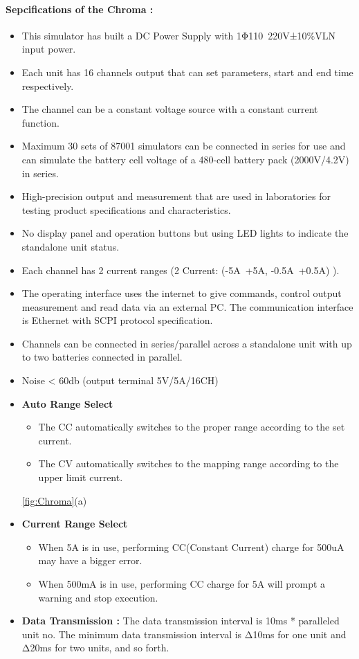 \paragraph{Sepcifications of the Chroma :}

\begin{itemize}
    \item This simulator has built a DC Power Supply with 1Φ110~220V±10$\%$VLN input power.
    \item Each unit has 16 channels output that can set parameters, start and end time respectively.
    \item The channel can be a constant voltage source with a constant current function.
    \item Maximum 30 sets of 87001 simulators can be connected in series for use and can simulate the battery cell voltage of a 480-cell battery pack (2000V/4.2V) in series.
    \item High-precision output and measurement that are used in laboratories for testing product specifications and characteristics.
    \item No display panel and operation buttons but using LED lights to indicate the standalone unit status.
    \item Each channel has 2 current ranges (2 Current: (-5A~+5A, -0.5A~+0.5A) ).
    \item The operating interface uses the internet to give commands, control output measurement and read data via an external PC. The communication interface is Ethernet with SCPI protocol specification.
    \item Channels can be connected in series/parallel across a standalone unit with up to two batteries connected in parallel.
    \item Noise < 60db (output terminal 5V/5A/16CH)
    \item \textbf{Auto Range Select }
            \begin{itemize}
                \item The CC automatically switches to the proper range according to the set current.
                \item The CV automatically switches to the mapping range according to the upper limit current.
            \end{itemize} \ref{fig:Chroma}(a)
    \item \textbf{Current Range Select }
            \begin{itemize}
                \item When 5A is in use, performing CC(Constant Current) charge for 500uA may have a bigger error.
                \item When 500mA is in use, performing CC charge for 5A will prompt a warning and stop execution.
            \end{itemize}

    \item \textbf{Data Transmission :} The data transmission interval is 10ms * paralleled unit no. The minimum data transmission interval is Δ10ms for one unit and Δ20ms for two units, and so forth.
    
\end{itemize}

